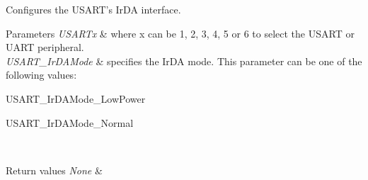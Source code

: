 Configures the U\+S\+A\+R\+T's Ir\+D\+A interface. 


\begin{DoxyParams}{Parameters}
{\em U\+S\+A\+R\+Tx} & where x can be 1, 2, 3, 4, 5 or 6 to select the U\+S\+A\+R\+T or U\+A\+R\+T peripheral. \\
\hline
{\em U\+S\+A\+R\+T\+\_\+\+Ir\+D\+A\+Mode} & specifies the Ir\+D\+A mode. This parameter can be one of the following values\+: \begin{DoxyItemize}
\item U\+S\+A\+R\+T\+\_\+\+Ir\+D\+A\+Mode\+\_\+\+Low\+Power \item U\+S\+A\+R\+T\+\_\+\+Ir\+D\+A\+Mode\+\_\+\+Normal \end{DoxyItemize}
\\
\hline
\end{DoxyParams}

\begin{DoxyRetVals}{Return values}
{\em None} & \\
\hline
\end{DoxyRetVals}
